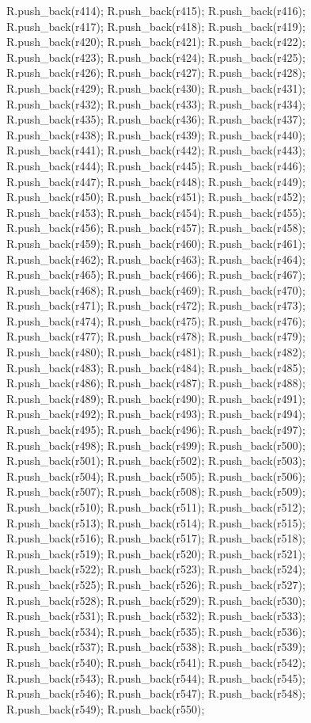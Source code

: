 \begin{DoxyCode}
{R.push_back(r414);
R.push_back(r415);
R.push_back(r416);
R.push_back(r417);
R.push_back(r418);
R.push_back(r419);
R.push_back(r420);
R.push_back(r421);
R.push_back(r422);
R.push_back(r423);
R.push_back(r424);
R.push_back(r425);
R.push_back(r426);
R.push_back(r427);
R.push_back(r428);
R.push_back(r429);
R.push_back(r430);
R.push_back(r431);
R.push_back(r432);
R.push_back(r433);
R.push_back(r434);
R.push_back(r435);
R.push_back(r436);
R.push_back(r437);
R.push_back(r438);
R.push_back(r439);
R.push_back(r440);
R.push_back(r441);
R.push_back(r442);
R.push_back(r443);
R.push_back(r444);
R.push_back(r445);
R.push_back(r446);
R.push_back(r447);
R.push_back(r448);
R.push_back(r449);
R.push_back(r450);
R.push_back(r451);
R.push_back(r452);
R.push_back(r453);
R.push_back(r454);
R.push_back(r455);
R.push_back(r456);
R.push_back(r457);
R.push_back(r458);
R.push_back(r459);
R.push_back(r460);
R.push_back(r461);
R.push_back(r462);
R.push_back(r463);
R.push_back(r464);
R.push_back(r465);
R.push_back(r466);
R.push_back(r467);
R.push_back(r468);
R.push_back(r469);
R.push_back(r470);
R.push_back(r471);
R.push_back(r472);
R.push_back(r473);
R.push_back(r474);
R.push_back(r475);
R.push_back(r476);
R.push_back(r477);
R.push_back(r478);
R.push_back(r479);
R.push_back(r480);
R.push_back(r481);
R.push_back(r482);
R.push_back(r483);
R.push_back(r484);
R.push_back(r485);
R.push_back(r486);
R.push_back(r487);
R.push_back(r488);
R.push_back(r489);
R.push_back(r490);
R.push_back(r491);
R.push_back(r492);
R.push_back(r493);
R.push_back(r494);
R.push_back(r495);
R.push_back(r496);
R.push_back(r497);
R.push_back(r498);
R.push_back(r499);
R.push_back(r500);
R.push_back(r501);
R.push_back(r502);
R.push_back(r503);
R.push_back(r504);
R.push_back(r505);
R.push_back(r506);
R.push_back(r507);
R.push_back(r508);
R.push_back(r509);
R.push_back(r510);
R.push_back(r511);
R.push_back(r512);
R.push_back(r513);
R.push_back(r514);
R.push_back(r515);
R.push_back(r516);
R.push_back(r517);
R.push_back(r518);
R.push_back(r519);
R.push_back(r520);
R.push_back(r521);
R.push_back(r522);
R.push_back(r523);
R.push_back(r524);
R.push_back(r525);
R.push_back(r526);
R.push_back(r527);
R.push_back(r528);
R.push_back(r529);
R.push_back(r530);
R.push_back(r531);
R.push_back(r532);
R.push_back(r533);
R.push_back(r534);
R.push_back(r535);
R.push_back(r536);
R.push_back(r537);
R.push_back(r538);
R.push_back(r539);
R.push_back(r540);
R.push_back(r541);
R.push_back(r542);
R.push_back(r543);
R.push_back(r544);
R.push_back(r545);
R.push_back(r546);
R.push_back(r547);
R.push_back(r548);
R.push_back(r549);
R.push_back(r550);
}
\end{DoxyCode}
